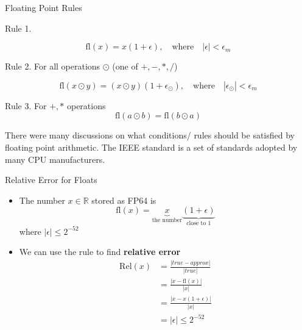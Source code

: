 \documentclass[10pt]{beamer}
\begin{document}
\begin{frame}{Floating Point Rules}
\begin{block}{Rule 1.} 

\[\mathrm{fl}(x) = x (1 + \epsilon), \quad \mbox{where} \quad 
|\epsilon| < \epsilon_m\]
\end{block}

\begin{block}{Rule 2.} 
For all operations $\odot$ (one of $+, -, *, / $)

\[\mathrm{fl}(x \odot y ) = (x \odot y) 
(1 + \epsilon_{\odot} ), \quad \mbox{where} \quad 
|\epsilon_\odot | < \epsilon_m\]
\end{block}

\begin{block}{Rule 3.}
For $+, *$  operations \[\mathrm{fl}(a \odot b) = \mathrm{fl}(b \odot a)\]
\end{block}

There were many discussions on what conditions/ rules
should be satisfied by floating point arithmetic. 
The IEEE standard is a set of standards adopted by many
CPU manufacturers.
\end{frame}

\begin{frame}{Relative Error for Floats}

\begin{itemize}
    \item The number $x\in \mathbb{R}$ stored as FP64 is 
    $$ \mathrm{fl}(x) = \underbrace{x}_{\text{the number}} \underbrace{(1+\epsilon)}_{\text{close to 1}}$$
    where $|\epsilon| \le 2^{-52}$

    \item We can use the rule to find \textbf{relative error}
        \begin{align*}
            \mathrm{Rel}(x) &= \frac{| true - approx|}{|true|}\\ 
             &= \frac{| x - \mathrm{fl}(x)|}{|x|}\\ 
             &= \frac{| x - x(1+\epsilon)|}{|x|}\\  
              & = |  \epsilon| \le 2^{-52}
        \end{align*}
\end{itemize}
\end{frame}
\end{document}
